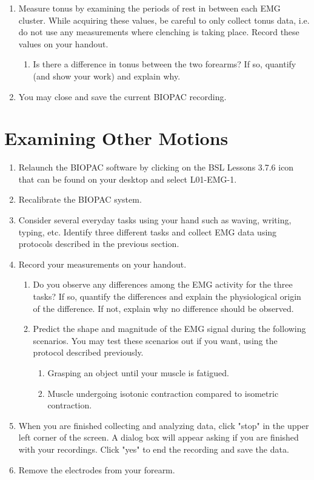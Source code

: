 \documentclass{article}
\begin{document}
\begin{enumerate}
	\item Measure tonus by examining the periods of rest in between each EMG cluster. While acquiring these values, be careful to only collect tonus data, i.e. do not use any measurements where clenching is taking place. Record these values on your handout.
	\begin{enumerate}
		\item Is there a difference in tonus between the two forearms? If so, quantify (and show your work) and explain why.
	\end{enumerate}
	
	\item You may close and save the current BIOPAC recording.
\end{enumerate}

\section*{Examining Other Motions}
\begin{enumerate}
	\item Relaunch the BIOPAC software by clicking on the BSL Lessons 3.7.6 icon that can be found on your desktop and select L01-EMG-1.
	\item Recalibrate the BIOPAC system.
	\item Consider several everyday tasks using your hand such as waving, writing, typing, etc. Identify three different tasks and collect EMG data using protocols described in the previous section.
	\item Record your measurements on your handout.
	\begin{enumerate}
		\item Do you observe any differences among the EMG activity for the three tasks? If so, quantify the differences and explain the physiological origin of the difference. If not, explain why no difference should be observed.
		\item Predict the shape and magnitude of the EMG signal during the following scenarios. You may test these scenarios out if you want, using the protocol described previously.
		\begin{enumerate}
			\item Grasping an object until your muscle is fatigued.
			\item Muscle undergoing isotonic contraction compared to isometric contraction.
		\end{enumerate}
	\end{enumerate}
	
	\item When you are finished collecting and analyzing data, click "stop" in the upper left corner of the screen. A dialog box will appear asking if you are finished with your recordings. Click "yes" to end the recording and save the data.
	\item Remove the electrodes from your forearm.
\end{enumerate}
\end{document}
